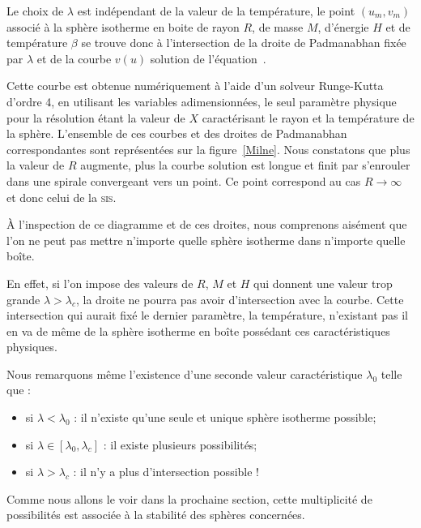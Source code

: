 	Le choix de $\lambda$ est indépendant de la valeur de la température, le point $(u_m,v_m)$ associé à la sphère
	isotherme en boite de rayon $R$, de masse $M$, d'énergie $H$ et de température $\beta$ se trouve donc à
	l'intersection de la droite de Padmanabhan fixée par $\lambda$ et de la courbe $v(u)$ solution de
	l'équation~. 
	
	
	Cette courbe est obtenue numériquement à l'aide d'un solveur Runge-Kutta d'ordre 4, en utilisant les variables adimensionnées, le
	seul paramètre physique pour la résolution étant la valeur de $X$ caractérisant le rayon et la température de la
	sphère.  L'ensemble de ces courbes et des droites de Padmanabhan correspondantes sont représentées sur la figure~\ref{Milne}.
	Nous constatons que plus la valeur de $R$ augmente, plus la courbe
	solution est longue et finit par s'enrouler dans une spirale convergeant vers un point. Ce point correspond au
	cas $R\to\infty$ et donc celui de la \textsc{sis}.
	
	À l'inspection de ce diagramme et de ces droites, nous comprenons aisément que l'on ne peut pas mettre
	n'importe quelle sphère isotherme dans n'importe quelle boîte. %

	En effet, si l'on impose des valeurs de $R$,
	$M$ et $H$ qui donnent une valeur trop grande $\lambda>\lambda_c$, la droite ne pourra pas avoir d'intersection
	avec la courbe. Cette intersection qui aurait fixé le dernier paramètre, la température, n'existant pas il en va
	de même de la sphère isotherme en boîte possédant ces caractéristiques physiques.
	
	Nous remarquons même l'existence d'une seconde valeur caractéristique $\lambda_0$ telle que :
	\begin{itemize}
		\item si $\lambda < \lambda_0$ : il n'existe qu'une seule et unique sphère isotherme possible;
		\item si $\lambda \in \left[\lambda_0,\lambda_c\right]$ : il existe plusieurs possibilités;
		\item si $\lambda > \lambda_c$ : il n'y a plus d'intersection possible !
	\end{itemize}

Comme nous allons le voir dans la prochaine section, cette multiplicité de possibilités est associée à la stabilité des sphères concernées.

